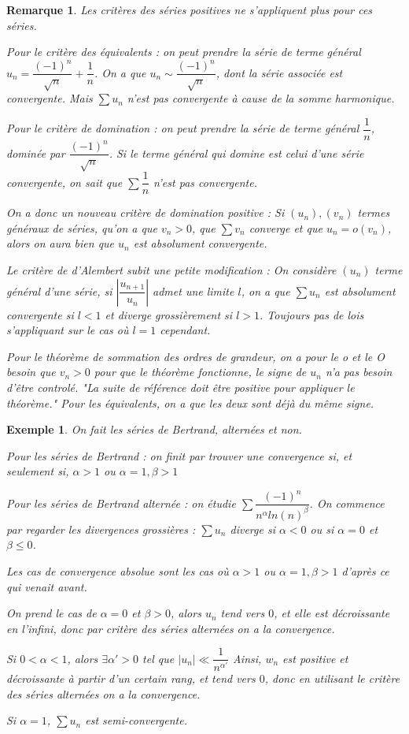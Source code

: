 \documentclass[a4paper,12pt]{book}
\newtheorem{Exe}{Exemple}[section]
\newtheorem{Rem}{Remarque}[section]
\begin{document}
\begin{Rem}
Les critères des séries positives ne s'appliquent plus pour ces séries.
\par Pour le critère des équivalents : on peut prendre la série de terme général $u_n = \dfrac{(-1)^n}{\sqrt{n}} + \dfrac{1}{n}$. On a que $u_n\sim\dfrac{(-1)^n}{\sqrt{n}}$, dont la série associée est convergente. Mais $\sum u_n$ n'est pas convergente à cause de la somme harmonique.
\par Pour le critère de domination : on peut prendre la série de terme général $\dfrac{1}{n}$, dominée par $\dfrac{(-1)^n}{\sqrt{n}}$. Si le terme général qui domine est celui d'une série convergente, on sait que $\sum \dfrac{1}{n}$ n'est pas convergente.
\par On a donc un nouveau critère de domination positive : Si $(u_n), (v_n)$ termes généraux de séries, qu'on a que $v_n>0$, que $\sum v_n$ converge et que $u_n = o(v_n)$, alors on aura bien que $u_n$ est absolument convergente.
\par Le critère de d'Alembert subit une petite modification : On considère $(u_n)$ terme général d'une série, si $\left|\dfrac{u_{n+1}}{u_n}\right|$ admet une limite $l$, on a que $\sum u_n$ est absolument convergente si $l<1$ et diverge grossièrement si $l>1$. Toujours pas de lois s'appliquant sur le cas où $l=1$ cependant.
\par Pour le théorème de sommation des ordres de grandeur, on a pour le o et le O besoin que $v_n>0$ pour que le théorème fonctionne, le signe de $u_n$ n'a pas besoin d'être controlé. "La suite de référence doit être positive pour appliquer le théorème." Pour les équivalents, on a que les deux sont déjà du même signe.
\end{Rem}

\begin{Exe}
On fait les séries de Bertrand, alternées et non.
\par Pour les séries de Bertrand : on finit par trouver une convergence si, et seulement si, $\alpha >1$ ou $\alpha = 1, \beta >1$
\par Pour les séries de Bertrand alternée : on étudie $\sum\dfrac{(-1)^n}{n^\alpha ln(n)^\beta}$. On commence par regarder les divergences grossières : $\sum u_n$ diverge si $\alpha<0$ ou si $\alpha = 0$ et $\beta\leq0$.
\par Les cas de convergence absolue sont les cas où $\alpha >1$ ou  $\alpha=1, \beta>1$ d'après ce qui venait avant.
\par On prend le cas de $\alpha =0$ et $\beta>0$, alors $u_n$ tend vers $0$, et elle est décroissante en l'infini, donc par critère des séries alternées on a la convergence.
\par Si $0<\alpha<1$, alors $\exists \alpha'>0$ tel que $\vert u_n\vert\ll\dfrac{1}{n^{\alpha'}}$ Ainsi, $w_n$ est positive et décroissante à partir d'un certain rang, et tend vers $0$, donc en utilisant le critère des séries alternées on a la convergence.
\par Si $\alpha =1$, $\sum u_n$ est semi-convergente. 
\end{Exe}
\end{document}
